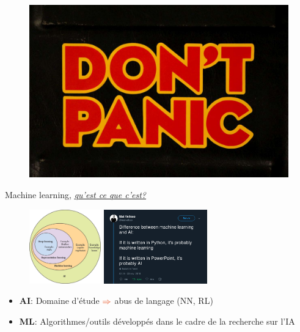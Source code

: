 \documentclass[aspectratio=169, 11pt]{beamer}
\begin{document}
\begin{frame}
  \begin{figure}
    \includegraphics[height=\textheight]{figs/dontpanic.jpg}
  \end{figure}
\end{frame}

\begin{frame}{Machine learning, \underline{\href{https://www.youtube.com/watch?v=O52jAYa4Pm8}{\textit{qu'est ce que c'est?}}}}
  \begin{figure}
    \includegraphics[width=0.276\textwidth]{figs/aiVennDiagram.png} \hspace{1cm}
    \includegraphics[width=0.4\textwidth]{figs/mlvsAI.png}
  \end{figure}
  \begin{itemize}
  \item \textcolor{agaetisOrange}{\textbf{AI}}: Domaine d'étude \boldmath $ \textcolor{agaetisOrange}{\Rightarrow}$ \unboldmath abus de langage (NN, RL)
  \item \textcolor{agaetisOrange}{\textbf{ML}}: Algorithmes/outils développés dans le cadre de la recherche sur l'IA
  \end{itemize}
\end{frame}
\end{document}
